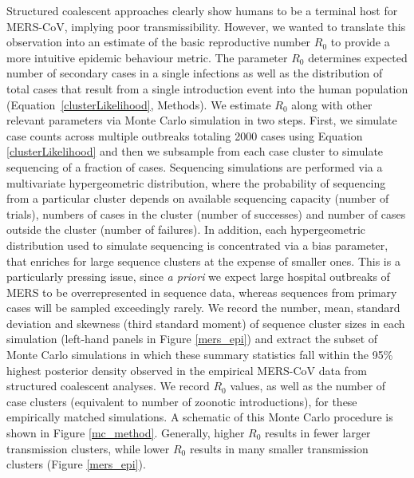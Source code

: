 \documentclass[11pt,oneside,letterpaper]{article}
\begin{document}
Structured coalescent approaches clearly show humans to be a terminal host for MERS-CoV, implying poor transmissibility.
However, we wanted to translate this observation into an estimate of the basic reproductive number $R_{0}$ to provide a more intuitive epidemic behaviour metric.
The parameter $R_{0}$ determines expected number of secondary cases in a single infections as well as the distribution of total cases that result from a single introduction event into the human population (Equation~\ref{clusterLikelihood}, Methods).
We estimate $R_{0}$ along with other relevant parameters via Monte Carlo simulation in two steps.
First, we simulate case counts across multiple outbreaks totaling 2000 cases using Equation \ref{clusterLikelihood} and then we subsample from each case cluster to simulate sequencing of a fraction of cases.
Sequencing simulations are performed via a multivariate hypergeometric distribution, where the probability of sequencing from a particular cluster depends on available sequencing capacity (number of trials), numbers of cases in the cluster (number of successes) and number of cases outside the cluster (number of failures).
In addition, each hypergeometric distribution used to simulate sequencing is concentrated via a bias parameter, that enriches for large sequence clusters at the expense of smaller ones.
This is a particularly pressing issue, since \textit{a priori} we expect large hospital outbreaks of MERS to be overrepresented in sequence data, whereas sequences from primary cases will be sampled exceedingly rarely.
We record the number, mean, standard deviation and skewness (third standard moment) of sequence cluster sizes in each simulation (left-hand panels in Figure \ref{mers_epi}) and extract the subset of Monte Carlo simulations in which these summary statistics fall within the 95\% highest posterior density observed in the empirical MERS-CoV data from structured coalescent analyses.
We record $R_{0}$ values, as well as the number of case clusters (equivalent to number of zoonotic introductions), for these empirically matched simulations.
A schematic of this Monte Carlo procedure is shown in Figure \ref{mc_method}.
Generally, higher $R_0$ results in fewer larger transmission clusters, while lower $R_0$ results in many smaller transmission clusters (Figure \ref{mers_epi}).
\end{document}
